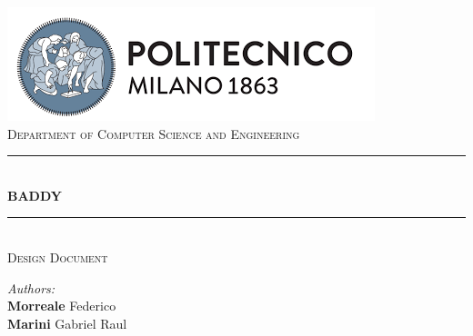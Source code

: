 \documentclass[a4paper, hidelinks, 12pt]{report}
\begin{document}
    \begin{titlepage}
        \centering
        \vspace*{0.7 cm}
        \includegraphics[scale = 0.85]{assets/polimi.png}\\[1.6 cm]
        \textsc{\large Department of Computer Science and Engineering}\\[1.8 cm]

        \rule{\linewidth}{0.2 mm} \\[0.4 cm]
        { \huge \bfseries BADDY}\\
        \rule{\linewidth}{0.2 mm} \\[1.5 cm]

        \textsc{\Large Design Document}\\[1 cm]


        \begin{minipage}{1\textwidth}
            \begin{flushleft}
                \large
                \emph{Authors:}\\
                \textbf{Morreale} Federico \\
                \textbf{Marini} Gabriel Raul \\
            \end{flushleft}
        \end{minipage}
        \newline
        \newline
        \vfill
    \end{titlepage}

    \tableofcontents
    \newpage
    \listoffigures
    \newpage
    \setcounter{page}{1}

    \newpage
    
    
    
    
\end{document}
